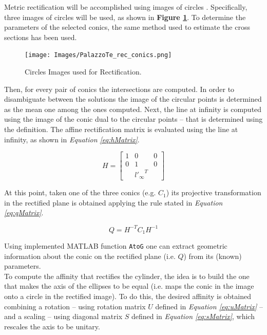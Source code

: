 \documentclass[12pt,a4paper]{article}
\begin{document}
Metric rectification will be accomplished using images of circles \cite{MetRecCircles}. Specifically, three images of circles will be used, as shown in \textbf{Figure \ref{fig:recConics}}. To determine the parameters of the selected conics, the same method used to estimate the cross sections has been used.

\begin{figure}[H]
    \centering
    \texttt{[image: Images/PalazzoTe\_rec\_conics.png]}
    \caption[Circles Images used for Rectification.]{Circles Images used for Rectification.}
    \label{fig:recConics}
\end{figure}

Then, for every pair of conics the intersections are computed. In order to disambiguate between the solutions the image of the circular points is determined as the mean one among the ones computed. Next, the line at infinity is computed using the image of the conic dual to the circular points -- that is determined using the definition. The affine rectification matrix is evaluated using the line at infinity, as shown in \textit{Equation \ref{eq:hMatrix}}.

\begin{equation}
    H = 
    \begin{bmatrix}
    1 & 0 & 0\\
    0 & 1 & 0\\
    & {l'_\infty}^T &
    \end{bmatrix}
    \label{eq:hMatrix}
\end{equation}
\bigskip

At this point, taken one of the three conics (e.g. $C_1$) its projective transformation in the rectified plane is obtained applying the rule stated in \textit{Equation \ref{eq:qMatrix}}.

\begin{equation}
    Q = H^{-T}C_1H^{-1}
    \label{eq:qMatrix}
\end{equation}
\bigskip

Using implemented MATLAB function \verb|AtoG| one can extract geometric information about the conic on the rectified plane (i.e. $Q$) from its (known) parameters.\\

To compute the affinity that rectifies the cylinder, the idea is to build the one that makes the axis of the ellipses to be equal (i.e. maps the conic in the image onto a circle in the rectified image). To do this, the desired affinity is obtained combining a rotation -- using rotation matrix $U$ defined in \textit{Equation \ref{eq:uMatrix}} -- and a scaling -- using diagonal matrix $S$ defined in \textit{Equation \ref{eq:sMatrix}}, which rescales the axis to be unitary.\\
\end{document}
